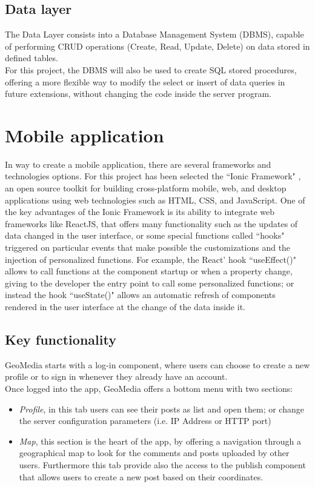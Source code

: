 \documentclass[conference]{IEEEtran}
\begin{document}
\subsection{Data layer}

The Data Layer consists into a Database Management System (DBMS), capable of performing CRUD operations (Create, Read, Update, Delete) on data stored in defined tables.
\\
For this project, the DBMS will also be used to create SQL stored procedures, offering a more flexible way to modify the select or insert of data queries in future extensions, without changing the code inside the server program.


\section{Mobile application}
In way to create a mobile application, there are several frameworks and technologies options. For this project has been selected the ``Ionic Framework" \cite{b1}, an open source toolkit for building cross-platform mobile, web, and desktop applications using web technologies such as HTML, CSS, and JavaScript.
One of the key advantages of the Ionic Framework is its ability to integrate web frameworks like ReactJS, that offers many functionality such as the updates of data changed in the user interface, or some special functions called ``hooks" triggered on particular events that make possible the customizations and the injection of personalized functions.
For example, the React' hook ``useEffect()" allows to call functions at the component startup or when a property change, giving to the developer the entry point to call some personalized functions; or instead the hook ``useState()" allows an automatic refresh of components rendered in the user interface at the change of the data inside it.


\subsection{Key functionality }

GeoMedia starts with a log-in component, where users can choose to create a new profile or to sign in whenever they already have an account.
\\
Once logged into the app, GeoMedia offers a bottom menu with two sections: 
\begin{itemize}
    \item \textit{Profile}, in this tab users can see their posts as list and open them; or change the server configuration parameters (i.e. IP Address or HTTP port)
    \item  \textit{Map}, this section is the heart of the app, by offering a navigation through a geographical map to look for the comments and posts uploaded by other users. Furthermore this tab provide also the access to the publish component that allows users to create a new post based on their coordinates.
\end{itemize}
\end{document}
